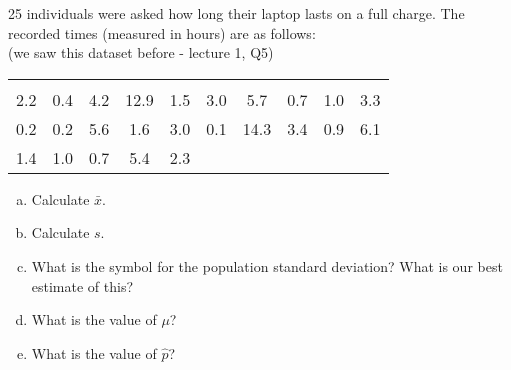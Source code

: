 \documentclass[]{report}
\begin{document}
25 individuals were asked how long their laptop lasts on a full charge. The recorded times (measured in hours) are as follows:\\
{\footnotesize(we saw this dataset before - lecture 1, Q5)}
\begin{center}
\begin{tabular}{|cccccccccc|}
\hline
&&&&&&&&&\\[-0.4cm]
2.2 & 0.4 & 4.2 & 12.9 & 1.5 & 3.0 & 5.7  & 0.7 & 1.0 & 3.3 \\
0.2 & 0.2 & 5.6 &  1.6 & 3.0 & 0.1 & 14.3 & 3.4 & 0.9 & 6.1 \\
1.4 & 1.0 & 0.7 & 5.4  & 2.3 &&&&&\\
\hline
\end{tabular}
\end{center}
\begin{enumerate}[a)]\itemsep0.3cm
\item Calculate $\bar x$.
\item Calculate $s$.
\item What is the symbol for the population standard deviation? What is our best estimate of this?
\item What is the value of $\mu$?
\item What is the value of $\hat p$?
\end{enumerate}
\end{document}
